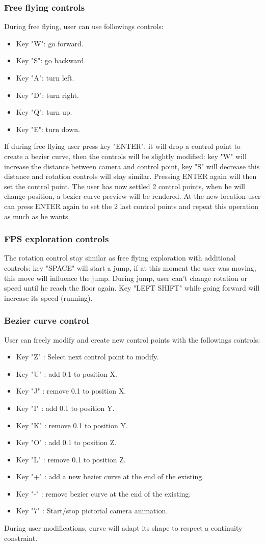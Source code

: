 \documentclass[a4paper,11pt]{article}
\begin{document}
\subsubsection{Free flying controls}
During free flying, user can use followings controls:
\begin{itemize}
\item Key "W": go forward.
\item Key "S": go backward.
\item Key "A": turn left.
\item Key "D": turn right.
\item Key "Q": turn up.
\item Key "E": turn down.
\end{itemize}
If during free flying user press key "ENTER", it will drop a control point to create a bezier curve, then the controls will be slightly modified: key "W" will increase the distance between camera and control point, key "S" will decrease this distance and rotation controls will stay similar. Pressing ENTER again will then set the control point. The user has now settled 2 control points, when he will change position, a bezier curve preview will be rendered. At the new location user can press ENTER again to set the 2 last control points and repeat this operation as much as he wants.

\subsubsection{FPS exploration controls}
The rotation control stay similar as free flying exploration with additional controls: key "SPACE" will start a jump, if at this moment the user was moving, this move will influence the jump. During jump, user can't change rotation or speed until he reach the floor again.  Key "LEFT SHIFT" while going forward will increase its speed (running).

\subsubsection{Bezier curve control}
User can freely modify and create new control points with the followings controls:  
\begin{itemize}
\item Key "Z" : Select next control point to modify.
\item Key "U" : add 0.1 to position X.
\item Key "J" : remove 0.1 to position X.
\item Key "I" : add 0.1 to position Y.
\item Key "K" : remove 0.1 to position Y.
\item Key "O" : add 0.1 to position Z.
\item Key "L" : remove 0.1 to position Z.
\item Key "+" : add a new bezier curve at the end of the existing.
\item Key "-" : remove bezier curve at the end of the existing.
\item Key "7" : Start/stop pictorial camera animation.
\end{itemize}
During user modifications, curve will adapt its shape to respect a continuity constraint.
\end{document}
